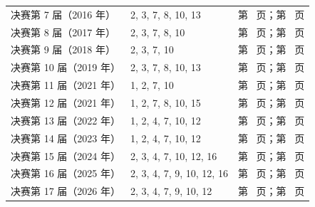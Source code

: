 \documentclass[12pt,fontset=fandol]{ctexart}
\begin{document}
\begin{longtable}{p{}p{}p{}}
决赛第 7 届（2016 年） & 2, 3, 7, 8, 10, 13 & 第~\pageref{ex:fin07-hi:2} 页；第~\pageref{ans:fin07-hi:2} 页\\

决赛第 8 届（2017 年） & 2, 3, 7, 8, 10 & 第~\pageref{ex:fin08-hi:2} 页；第~\pageref{ans:fin08-hi:2} 页\\

决赛第 9 届（2018 年） & 2, 3, 7, 10 & 第~\pageref{ex:fin09-hi:2} 页；第~\pageref{ans:fin09-hi:2} 页\\

决赛第 10 届（2019 年） & 2, 3, 7, 8, 10, 13 & 第~\pageref{ex:fin10-hi:2} 页；第~\pageref{ans:fin10-hi:2} 页\\

决赛第 11 届（2021 年） & 1, 2, 7, 10 & 第~\pageref{ex:fin11-high:1} 页；第~\pageref{ans:fin11-high:1} 页\\

决赛第 12 届（2021 年） & 1, 2, 7, 8, 10, 15 & 第~\pageref{ex:fin12-high:1} 页；第~\pageref{ans:fin12-high:1} 页\\

决赛第 13 届（2022 年） & 1, 2, 4, 7, 10, 12 & 第~\pageref{ex:fin13-high:1} 页；第~\pageref{ans:fin13-high:1} 页\\

决赛第 14 届（2023 年） & 1, 2, 4, 7, 10, 12 & 第~\pageref{ex:fin14-high:1} 页；第~\pageref{ans:fin14-high:1} 页\\

决赛第 15 届（2024 年） & 2, 3, 4, 7, 10, 12, 16 & 第~\pageref{ex:fin15-high:2} 页；第~\pageref{ans:fin15-high:2} 页\\

决赛第 16 届（2025 年） & 2, 3, 4, 7, 9, 10, 12, 16 & 第~\pageref{ex:fin16-high:2} 页；第~\pageref{ans:fin16-high:2} 页\\

决赛第 17 届（2026 年） & 2, 3, 4, 7, 9, 10, 12 & 第~\pageref{ex:fin17-high:2} 页；第~\pageref{ans:fin17-high:2} 页\\

\bottomrule\end{longtable}
\end{document}
